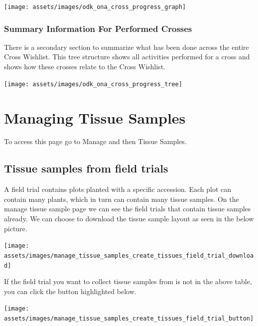 \documentclass[
  12pt,
]{book}
\begin{document}
\begin{center}\texttt{[image: assets/images/odk\_ona\_cross\_progress\_graph]} \end{center}

\hypertarget{summary-information-for-performed-crosses}{%
\subsection{Summary Information For Performed Crosses}\label{summary-information-for-performed-crosses}}

There is a secondary section to summarize what has been done across the entire Cross Wishlist. This tree structure shows all activities performed for a cross and shows how these crosses relate to the Cross Wishlist.

\begin{center}\texttt{[image: assets/images/odk\_ona\_cross\_progress\_tree]} \end{center}

\hypertarget{managing-tissue-samples}{%
\chapter{Managing Tissue Samples}\label{managing-tissue-samples}}

To access this page go to Manage and then Tissue Samples.

\hypertarget{tissue-samples-from-field-trials}{%
\section{Tissue samples from field trials}\label{tissue-samples-from-field-trials}}

A field trial contains plots planted with a specific accession. Each plot can contain many plants, which in turn can contain many tissue samples. On the manage tissue sample page we can see the field trials that contain tissue samples already. We can choose to download the tissue sample layout as seen in the below picture.

\begin{center}\texttt{[image: assets/images/manage\_tissue\_samples\_create\_tissues\_field\_trial\_download]} \end{center}

If the field trial you want to collect tissue samples from is not in the above table, you can click the button highlighted below.

\begin{center}\texttt{[image: assets/images/manage\_tissue\_samples\_create\_tissues\_field\_trial\_button]} \end{center}
\end{document}
